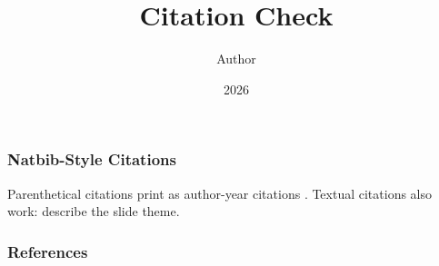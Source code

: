 \documentclass[notheorems,aspectratio=169]{beamer}
\title{Citation Check}
\author{Author}
\date{2026}
\begin{document}
\maketitle

\begin{frame}
  \frametitle{Natbib-Style Citations}
  Parenthetical citations print as author-year citations \citep{mucsanyi2026slidemint}.
  Textual citations also work: \citet{mucsanyi2026slidemint} describe the slide theme.
\end{frame}

\begin{frame}[allowframebreaks]
  \frametitle{References}
  \printbibliography[heading=none]
\end{frame}
\end{document}
